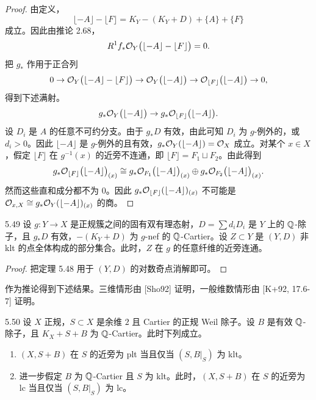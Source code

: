 \begin{proof}
由定义，
\[
\lfloor-A\rfloor-\lfloor F\rfloor=K_Y-(K_Y+D)+\{A\}+\{F\}
\]
成立。因此由推论 2.68，
\[
R^1f_*\mathcal{O}_Y\bigl(\lfloor-A\rfloor-\lfloor F\rfloor\bigr)=0.
\]
把 $g_*$ 作用于正合列
\[
0\to\mathcal{O}_Y\bigl(\lfloor-A\rfloor-\lfloor F\rfloor\bigr)\to\mathcal{O}_Y\bigl(\lfloor-A\rfloor\bigr)\to\mathcal{O}_{\lfloor F\rfloor}\bigl(\lfloor-A\rfloor\bigr)\to0,
\]
得到下述满射。
\[
g_*\mathcal{O}_Y\bigl(\lfloor-A\rfloor\bigr)\to g_*\mathcal{O}_{\lfloor F\rfloor}\bigl(\lfloor-A\rfloor\bigr).
\]
设 $D_i$ 是 $A$ 的任意不可约分支。由于 $g_*D$ 有效，由此可知 $D_i$ 为 $g$-例外的，或 $d_i>0$。因此 $\lfloor-A\rfloor$ 是 $g$-例外的且有效，$g_*\mathcal{O}_Y(\lfloor-A\rfloor)=\mathcal{O}_X$ 成立。对某个 $x\in X$，假定 $\lfloor F\rfloor$ 在 $g^{-1}(x)$ 的近旁不连通，即 $\lfloor F\rfloor=F_1\sqcup F_2$。由此得到
\[
g_*\mathcal{O}_{\lfloor F\rfloor}\bigl(\lfloor-A\rfloor\bigr)_{(x)}\cong g_*\mathcal{O}_{F_1}\bigl(\lfloor-A\rfloor\bigr)_{(x)}\oplus g_*\mathcal{O}_{F_2}\bigl(\lfloor-A\rfloor\bigr)_{(x)}.
\]
然而这些直和成分都不为 $0$。因此 $g_*\mathcal{O}_{\lfloor F\rfloor}(\lfloor-A\rfloor)_{(x)}$ 不可能是 $\mathcal{O}_{x,X}\cong g_*\mathcal{O}_Y(\lfloor-A\rfloor)_{(x)}$ 的商。
\end{proof}

\begin{corollaryp}{5.49}
设 $g\colon Y\to X$ 是正规簇之间的固有双有理态射，$D=\sum d_iD_i$ 是 $Y$ 上的 $\mathbb{Q}$-除子，且 $g_*D$ 有效，$-(K_Y+D)$ 为 $g$-nef 的 $\mathbb{Q}$-Cartier。设 $Z\subset Y$ 是 $(Y,D)$ 非 klt 的点全体构成的部分集合。此时，$Z$ 在 $g$ 的任意纤维的近旁连通。
\end{corollaryp}

\begin{proof}
把定理 5.48 用于 $(Y,D)$ 的对数奇点消解即可。
\end{proof}

作为推论得到下述结果。三维情形由 [Sho92] 证明，一般维数情形由 [K+92, 17.6-7] 证明。

\begin{theoremp}[{伴随反转}]{5.50}
设 $X$ 正规，$S\subset X$ 是余维 $2$ 且 Cartier 的正规 Weil 除子。设 $B$ 是有效 $\mathbb{Q}$-除子，且 $K_X+S+B$ 为 $\mathbb{Q}$-Cartier。此时下列成立。
\begin{enumerate}[label=(\arabic*),leftmargin=*]
\item $(X,S+B)$ 在 $S$ 的近旁为 plt 当且仅当 $(S,B|_S)$ 为 klt。
\item 进一步假定 $B$ 为 $\mathbb{Q}$-Cartier 且 $S$ 为 klt。此时，$(X,S+B)$ 在 $S$ 的近旁为 lc 当且仅当 $(S,B|_S)$ 为 lc。
\end{enumerate}
\end{theoremp}

